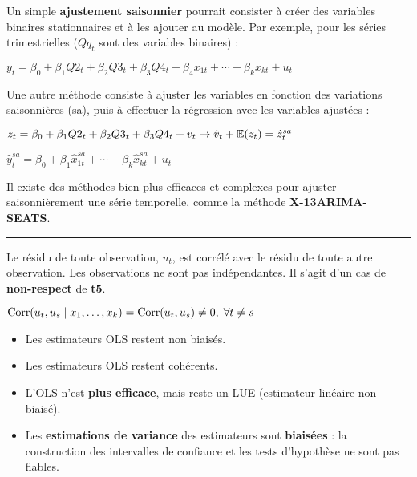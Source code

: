 \begin{f}[Saisonnalité]
Un simple \textbf{ajustement saisonnier} pourrait consister à créer des variables binaires stationnaires et à les ajouter au modèle. Par exemple, pour les séries trimestrielles ($Q q_{t}$ sont des variables binaires) :

\begin{center}
	$y_{t} = \beta_{0} + \beta_{1} Q2_{t} + \beta_{2} Q3_{t} + \beta_{3} Q4_{t} + \beta_{4} x_{1t} + \cdots + \beta_{k} x_{kt} + u_{t}$
\end{center}

Une autre méthode consiste à ajuster les variables en fonction des variations saisonnières (sa), puis à effectuer la régression avec les variables ajustées :

\begin{center}
	$z_{t} = \beta_{0} + \beta_{1} Q2_{t} + \beta_{2} Q3_{t} + \beta_{3} Q4_{t} + v_{t} \rightarrow \hat{v}_{t} + \mathbb{E}(z_{t}) = \hat{z}_{t}^{sa}$
	
	$\hat{y}_{t}^{sa}= \beta_{0} + \beta_{1} \hat{x}_{1t}^{sa} + \cdots + \beta_{k} \hat{x}_{kt}^{sa} + u_{t}$
\end{center}

Il existe des méthodes bien plus efficaces et complexes pour ajuster saisonnièrement une série temporelle, comme la méthode \textbf{X-13ARIMA-SEATS}.

\end{f}  \hrule

\begin{f}[Autocorrélation]

Le résidu de toute observation, $u_{t}$, est corrélé avec le résidu de toute autre observation. Les observations ne sont pas indépendantes. Il s'agit d'un cas de \textbf{non-respect} de \textbf{t5}.

\begin{center}
	$\mathrm{Corr}(u_{t}, u_{s} \mid x_{1}, \ldots, x_{k}) = \mathrm{Corr}(u_{t}, u_{s}) \neq 0, \; \forall t \neq s$
\end{center}

\end{f}    
\begin{f}[Conséquences]

\begin{itemize}[leftmargin=*]
	\item Les estimateurs OLS restent non biaisés.
	\item Les estimateurs OLS restent cohérents.
	\item L'OLS n'est \textbf{plus efficace}, mais reste un LUE (estimateur linéaire non biaisé).
	\item Les \textbf{estimations de variance} des estimateurs sont \textbf{biaisées} : la construction des intervalles de confiance et les tests d'hypothèse ne sont pas fiables.
\end{itemize}

\end{f}    

